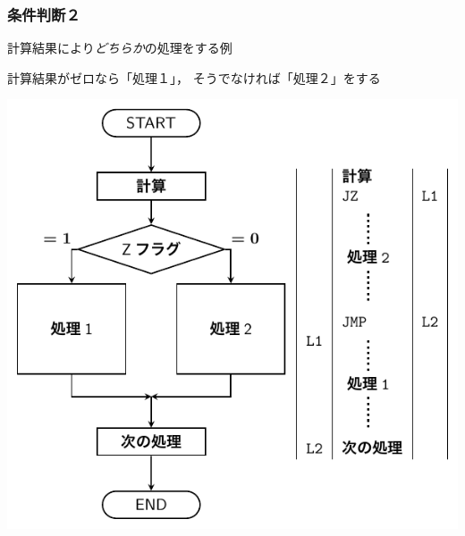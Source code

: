 \documentclass{beamer}                 %
\begin{document}
\begin{frame}
  \frametitle{条件判断２}
  計算結果により\emph{どちらか}の処理をする例
  \vfill
  \begin{itembox}[l]{\footnotesize 計算結果がゼロなら「処理１」，
      そうでなければ「処理２」をする}
    \centerline{\includegraphics[scale=0.65]{../Tikz/flow2B.pdf}}
  \end{itembox}
  \vfill
\end{frame}
\end{document}
